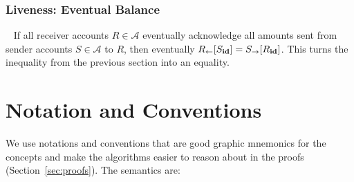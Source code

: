 \documentclass[9pt, oneside]{article}   	%
\begin{document}
\subsubsection{Liveness: Eventual Balance}

\pf~ If all receiver accounts $R \in \mathcal{A}$ eventually acknowledge all amounts sent from sender accounts $S \in \mathcal{A}$ to $R$, then eventually $R_{\leftarrow}[S_{\scriptsize \textbf{id}}] = S_{\rightarrow}[R_{\scriptsize \textbf{id}}]$. This turns the inequality from the previous section into an equality.



\section{Notation and Conventions}
\label{apdx:notation}

We use notations and conventions that are good graphic mnemonics for the concepts and make the algorithms easier to reason about in the proofs (Section~\ref{sec:proofs}). The semantics are:
\end{document}
